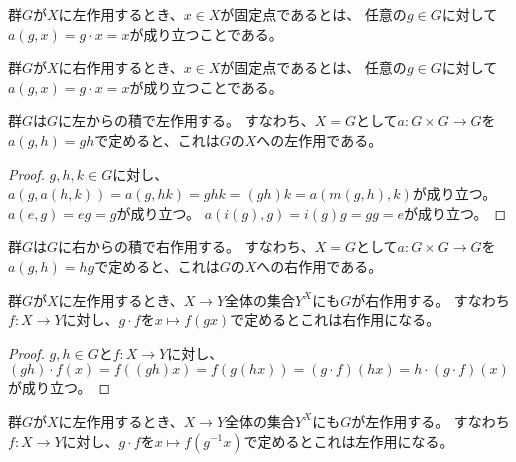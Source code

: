 \begin{definition}
    \label{left-fixed-point}
    \leanok
    群$G$が$X$に左作用するとき、$x\in X$が固定点であるとは、
    任意の$g\in G$に対して$a(g,x)=g\cdot x=x$が成り立つことである。
\end{definition}

\begin{proposition}
    \label{right-fixed-point}
    群$G$が$X$に右作用するとき、$x\in X$が固定点であるとは、
    任意の$g\in G$に対して$a(g,x)=g\cdot x=x$が成り立つことである。
\end{proposition}

\begin{proposition}
    \label{left-multiplication}
    \leanok
    群$G$は$G$に左からの積で左作用する。
    すなわち、$X=G$として$a:G\times G\to G$を$a(g,h)=gh$で定めると、これは$G$の$X$への左作用である。
\end{proposition}

\begin{proof}
    \leanok
    $g, h, k\in G$に対し、
    $a(g,a(h,k))=a(g,hk)=ghk=(gh)k=a(m(g,h),k)$が成り立つ。
    $a(e,g)=eg=g$が成り立つ。
    $a(i(g),g)=i(g)g=gg=e$が成り立つ。
\end{proof}

\begin{proposition}
    \label{right-multiplication}
    群$G$は$G$に右からの積で右作用する。
    すなわち、$X=G$として$a:G\times G\to G$を$a(g,h)=hg$で定めると、これは$G$の$X$への右作用である。
\end{proposition}

\begin{proposition}
    \label{left-function-right-action}
    群$G$が$X$に左作用するとき、$X \to Y$全体の集合$Y^X$にも$G$が右作用する。
    すなわち$f:X\to Y$に対し、$g\cdot f$を$x\mapsto f(gx)$で定めるとこれは右作用になる。
\end{proposition}

\begin{proof}
    $g, h\in G$と$f:X\to Y$に対し、
    $(gh)\cdot f(x)=f((gh)x)=f(g(hx))=(g\cdot f)(hx)=h\cdot(g\cdot f)(x)$が成り立つ。
\end{proof}

\begin{proposition}
    \label{left-function-left-action}
    \leanok
    群$G$が$X$に左作用するとき、$X \to Y$全体の集合$Y^X$にも$G$が左作用する。
    すなわち$f:X\to Y$に対し、$g\cdot f$を$x\mapsto f(g^{-1}x)$で定めるとこれは左作用になる。
\end{proposition}

